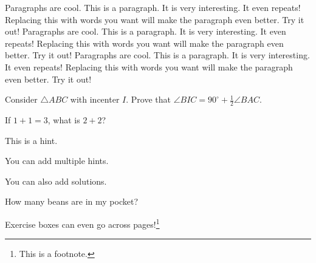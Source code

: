 \documentclass[twoside]{article}
\begin{document}
\begin{fact}

\end{fact}

\begin{remark}

\end{remark}

\begin{basecase}

\end{basecase}

\begin{indstep}

\end{indstep}

\begin{case}

\end{case}

\begin{boxpar}
Paragraphs are cool. This is a paragraph. It is very interesting. It even repeats! Replacing this with words you want will make the paragraph even better. Try it out! Paragraphs are cool. This is a paragraph. It is very interesting. It even repeats! Replacing this with words you want will make the paragraph even better. Try it out! Paragraphs are cool. This is a paragraph. It is very interesting. It even repeats! Replacing this with words you want will make the paragraph even better. Try it out!
\end{boxpar}

\begin{exercisebox}
\begin{exercise}
Consider $\triangle ABC$ with incenter $I.$ Prove that $\angle BIC=90^{\circ}+\frac{1}{2}\angle BAC.$
\end{exercise}
\begin{exercise}
If $1+1=3$, what is $2+2$?
\begin{hint}
\begin{addhint}
{This is a hint.}
\end{addhint}
\begin{addhint}
{You can add multiple hints.}
\end{addhint}
\end{hint}
\begin{sol}
\begin{addsol}
{You can also add solutions.}
\end{addsol}
\end{sol}
\end{exercise}
\begin{exercise}
How many beans are in my pocket?
\end{exercise}
\begin{exercise}
Exercise boxes can even go across pages!\footnote{This is a footnote.}
\end{exercise}
\end{exercisebox}

\appendix %


\end{document}
